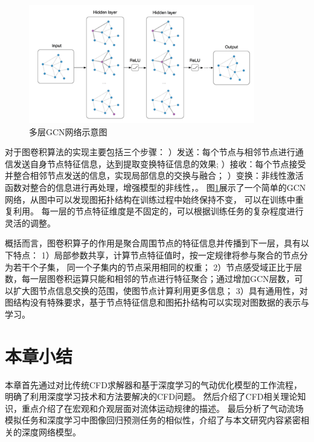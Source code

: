 \begin{figure}[htp]
	\centering
	\includegraphics[width=0.88\textwidth]{figures/GCN.png}
	\caption{多层GCN网络示意图}
	\label{fig:gcn}
\end{figure}

对于图卷积算法的实现主要包括三个步骤：
）发送：每个节点与相邻节点进行通信发送自身节点特征信息，达到提取变换特征信息的效果;
）接收：每个节点接受并整合相邻节点发送的信息，实现局部信息的交换与融合；
）变换：非线性激活函数对整合的信息进行再处理，增强模型的非线性，。
图\ref{fig:gcn}展示了一个简单的GCN网络，从图中可以发现图拓扑结构在训练过程中始终保持不变，
可以在训练中重复利用。
每一层的节点特征维度是不固定的，可以根据训练任务的复杂程度进行灵活的调整。

概括而言，图卷积算子的作用是聚合周围节点的特征信息并传播到下一层，具有以下特点：
1）局部参数共享，计算节点特征值时，按一定规律将参与聚合的节点分为若干个子集，
同一个子集内的节点采用相同的权重；
2）节点感受域正比于层数，每一层图卷积运算只能和相邻的节点进行特征聚合；通过增加GCN层数，可以扩大图节点信息交换的范围，使图节点计算利用更多信息；
3）具有通用性，对图结构没有特殊要求，基于节点特征信息和图拓扑结构可以实现对图数据的表示与学习。





\section{本章小结}

本章首先通过对比传统CFD求解器和基于深度学习的气动优化模型的工作流程，明确了利用深度学习技术和方法要解决的CFD问题。
然后介绍了CFD相关理论知识，重点介绍了在宏观和介观层面对流体运动规律的描述。
最后分析了气动流场模拟任务和深度学习中图像回归预测任务的相似性，介绍了与本文研究内容紧密相关的深度网络模型。





